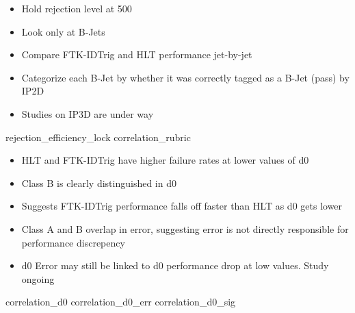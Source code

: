     { \begin{itemize}
        \item Hold rejection level at 500
        \item Look only at B-Jets
        \item Compare FTK-IDTrig and HLT performance jet-by-jet
        \item Categorize each B-Jet by whether it was correctly tagged as a B-Jet (pass) by IP2D
        \item Studies on IP3D are under way
    \end{itemize} }
    {rejection_efficiency_lock}
    {correlation_rubric}

    { \begin{itemize}
        \item HLT and FTK-IDTrig have higher failure rates at lower values of d0
        \item Class B is clearly distinguished in d0
        \item Suggests FTK-IDTrig performance falls off faster than HLT as d0 gets lower
        \item Class A and B overlap in error,
            suggesting error is not directly responsible for performance discrepency
        \item d0 Error may still be linked to d0 performance drop at low values. Study ongoing
    \end{itemize} }
    {correlation_d0}
    {correlation_d0_err}
    {correlation_d0_sig}

